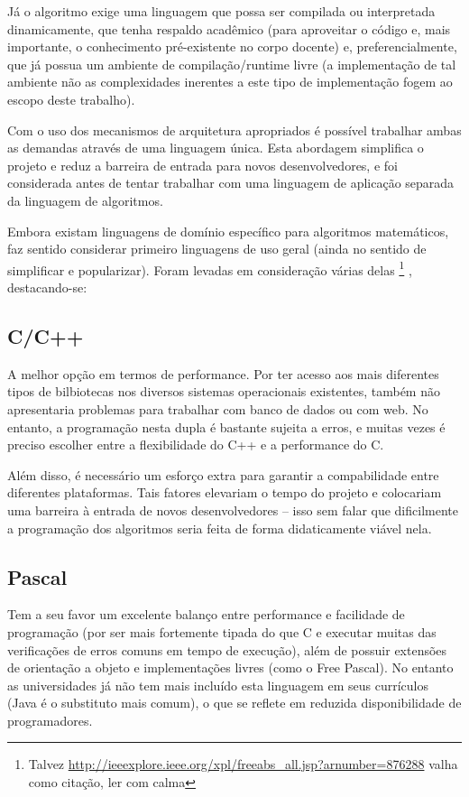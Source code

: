 \documentclass[11pt]{book}
\begin{document}
Já o algoritmo exige uma linguagem que possa ser compilada ou interpretada dinamicamente, que tenha respaldo acadêmico (para aproveitar o código e, mais importante, o conhecimento pré-existente no corpo docente) e, preferencialmente, que já possua um ambiente de compilação/runtime livre (a implementação de tal ambiente não as complexidades inerentes a este tipo de implementação fogem ao escopo deste trabalho). 

Com o uso dos mecanismos de arquitetura apropriados é possível trabalhar ambas as demandas através de uma linguagem única. Esta abordagem simplifica o projeto e reduz a barreira de entrada para novos desenvolvedores, e foi considerada antes de tentar trabalhar com uma linguagem de aplicação separada da linguagem de algoritmos.

Embora existam linguagens de domínio específico para algoritmos matemáticos, faz sentido considerar primeiro linguagens de uso geral (ainda no sentido de simplificar e popularizar). Foram levadas em consideração várias delas
\footnote{Talvez \url{http://ieeexplore.ieee.org/xpl/freeabs_all.jsp?arnumber=876288} valha como citação, ler com calma}
, destacando-se:

\subsection*{C/C++}
A melhor opção em termos de performance. Por ter acesso aos mais diferentes tipos de bilbiotecas nos diversos sistemas operacionais existentes, também não apresentaria problemas para trabalhar com banco de dados ou com web. No entanto, a programação nesta dupla é bastante sujeita a erros, e muitas vezes é preciso escolher entre a flexibilidade do C++ e a performance do C.

Além disso, é necessário um esforço extra para garantir a compabilidade entre diferentes plataformas. Tais fatores elevariam o tempo do  projeto e colocariam uma barreira à entrada de novos desenvolvedores – isso sem falar que dificilmente a programação dos algoritmos seria feita de forma didaticamente viável nela.

\subsection*{Pascal}
Tem a seu favor um excelente balanço entre performance e facilidade de programação (por ser mais fortemente tipada do que C e executar muitas das verificações de erros comuns em tempo de execução), além de possuir extensões de orientação a objeto e implementações livres (como o Free Pascal). No entanto as universidades já não tem mais incluído esta linguagem em seus currículos (Java é o substituto mais comum), o que se reflete em reduzida disponibilidade de programadores.
\end{document}
